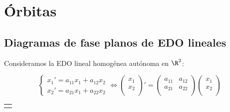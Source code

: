 \section{Órbitas}
\subsection{Diagramas de fase planos de EDO lineales}

Consideramos la EDO lineal homogénea autónoma en $\R^2$:

\begin{equation}
\left\{\begin{array}{rl}
x_1'=a_{11}x_1+a_{12}x_2 \\
x_2'=a_{21}x_1+a_{22}x_2
\end{array}\right.\Leftrightarrow
\begin{pmatrix}
x_1 \\
x_2 \\
\end{pmatrix}
'=
\begin{pmatrix}
a_{11} & a_{12} \\
a_{21} & a_{22} \\
\end{pmatrix}
\begin{pmatrix}
x_1 \\
x_2 \\
\end{pmatrix}
\end{equation}


\newcommand\newtemplate[4][0.4]%
 {\newsavebox#2%
   \savebox#2%
   {\begin{tabular}{@{}c@{}}
      \\[2#1ex]
      \begin{tikzpicture}[scale=#1]
      #4
      \end{tikzpicture}\\[4#1ex]
     \end{tabular}%
   }%
 }
\newcommand\template[1]{\usebox{#1}}             %
\newcommand\templatecaption[1]{{\sffamily\scriptsize#1}}       %
\newcommand\Tr{\mathop{\mathrm{tr}}}

\newtemplate\sink{sink}%
 {\foreach \sx in {+,-}                   %
   {\draw[flow] (\sx4,0) -- (0,0);        %
    \draw[flow] (0,\sx4) -- (0,0);        %
    \foreach \sy in {+,-}                 %
      \foreach \a/\b in {2/1,3/0.44}      %
        \draw[flow,domain=\sx\a:0] plot (\x, {\sy\b*\x*\x});
   }
 }

